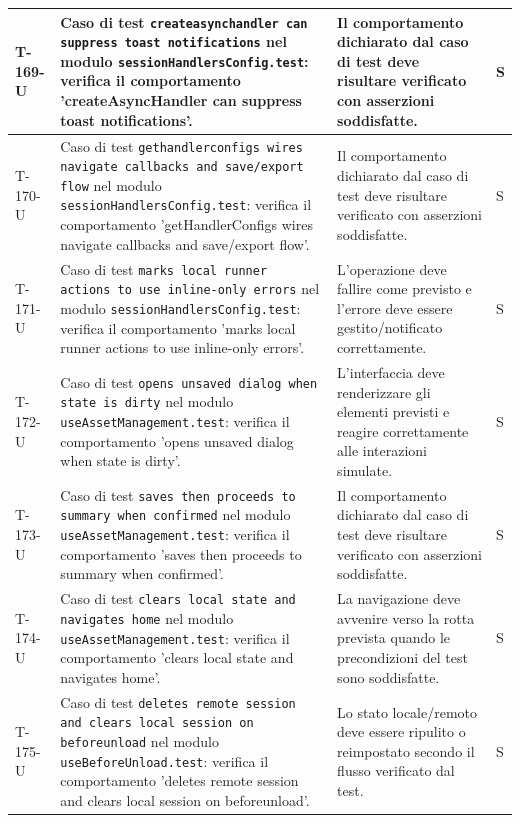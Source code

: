 \documentclass[a4paper,12pt]{article}
\begin{document}
{{\begin{longtable}{|>{\RaggedRight\arraybackslash}p{1.55cm}|>{\RaggedRight\arraybackslash}p{8.0cm}|>{\RaggedRight\arraybackslash}p{4.6cm}|>{\RaggedRight\arraybackslash}p{1.2cm}|}
        \hline
        T-169-U & Caso di test \texttt{createasynchandler can suppress toast notifications} nel modulo \texttt{sessionHandlersConfig.test}: verifica il comportamento 'createAsyncHandler can suppress toast notifications'. & Il comportamento dichiarato dal caso di test deve risultare verificato con asserzioni soddisfatte. & S \\
        \hline
        T-170-U & Caso di test \texttt{gethandlerconfigs wires navigate callbacks and save/export flow} nel modulo \texttt{sessionHandlersConfig.test}: verifica il comportamento 'getHandlerConfigs wires navigate callbacks and save/export flow'. & Il comportamento dichiarato dal caso di test deve risultare verificato con asserzioni soddisfatte. & S \\
        \hline
        T-171-U & Caso di test \texttt{marks local runner actions to use inline-only errors} nel modulo \texttt{sessionHandlersConfig.test}: verifica il comportamento 'marks local runner actions to use inline-only errors'. & L'operazione deve fallire come previsto e l'errore deve essere gestito/notificato correttamente. & S \\
        \hline
        T-172-U & Caso di test \texttt{opens unsaved dialog when state is dirty} nel modulo \texttt{useAssetManagement.test}: verifica il comportamento 'opens unsaved dialog when state is dirty'. & L'interfaccia deve renderizzare gli elementi previsti e reagire correttamente alle interazioni simulate. & S \\
        \hline
        T-173-U & Caso di test \texttt{saves then proceeds to summary when confirmed} nel modulo \texttt{useAssetManagement.test}: verifica il comportamento 'saves then proceeds to summary when confirmed'. & Il comportamento dichiarato dal caso di test deve risultare verificato con asserzioni soddisfatte. & S \\
        \hline
        T-174-U & Caso di test \texttt{clears local state and navigates home} nel modulo \texttt{useAssetManagement.test}: verifica il comportamento 'clears local state and navigates home'. & La navigazione deve avvenire verso la rotta prevista quando le precondizioni del test sono soddisfatte. & S \\
        \hline
        T-175-U & Caso di test \texttt{deletes remote session and clears local session on beforeunload} nel modulo \texttt{useBeforeUnload.test}: verifica il comportamento 'deletes remote session and clears local session on beforeunload'. & Lo stato locale/remoto deve essere ripulito o reimpostato secondo il flusso verificato dal test. & S \\

\end{longtable}}}
\end{document}
